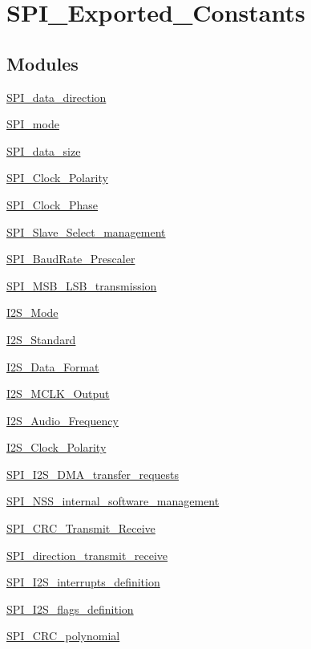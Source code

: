 \hypertarget{group__SPI__Exported__Constants}{
\section{SPI\_\-Exported\_\-Constants}
\label{group__SPI__Exported__Constants}
}
\subsection*{Modules}
\begin{DoxyCompactItemize}
\item 
\hyperlink{group__SPI__data__direction}{SPI\_\-data\_\-direction}
\item 
\hyperlink{group__SPI__mode}{SPI\_\-mode}
\item 
\hyperlink{group__SPI__data__size}{SPI\_\-data\_\-size}
\item 
\hyperlink{group__SPI__Clock__Polarity}{SPI\_\-Clock\_\-Polarity}
\item 
\hyperlink{group__SPI__Clock__Phase}{SPI\_\-Clock\_\-Phase}
\item 
\hyperlink{group__SPI__Slave__Select__management}{SPI\_\-Slave\_\-Select\_\-management}
\item 
\hyperlink{group__SPI__BaudRate__Prescaler}{SPI\_\-BaudRate\_\-Prescaler}
\item 
\hyperlink{group__SPI__MSB__LSB__transmission}{SPI\_\-MSB\_\-LSB\_\-transmission}
\item 
\hyperlink{group__I2S__Mode}{I2S\_\-Mode}
\item 
\hyperlink{group__I2S__Standard}{I2S\_\-Standard}
\item 
\hyperlink{group__I2S__Data__Format}{I2S\_\-Data\_\-Format}
\item 
\hyperlink{group__I2S__MCLK__Output}{I2S\_\-MCLK\_\-Output}
\item 
\hyperlink{group__I2S__Audio__Frequency}{I2S\_\-Audio\_\-Frequency}
\item 
\hyperlink{group__I2S__Clock__Polarity}{I2S\_\-Clock\_\-Polarity}
\item 
\hyperlink{group__SPI__I2S__DMA__transfer__requests}{SPI\_\-I2S\_\-DMA\_\-transfer\_\-requests}
\item 
\hyperlink{group__SPI__NSS__internal__software__management}{SPI\_\-NSS\_\-internal\_\-software\_\-management}
\item 
\hyperlink{group__SPI__CRC__Transmit__Receive}{SPI\_\-CRC\_\-Transmit\_\-Receive}
\item 
\hyperlink{group__SPI__direction__transmit__receive}{SPI\_\-direction\_\-transmit\_\-receive}
\item 
\hyperlink{group__SPI__I2S__interrupts__definition}{SPI\_\-I2S\_\-interrupts\_\-definition}
\item 
\hyperlink{group__SPI__I2S__flags__definition}{SPI\_\-I2S\_\-flags\_\-definition}
\item 
\hyperlink{group__SPI__CRC__polynomial}{SPI\_\-CRC\_\-polynomial}
\end{DoxyCompactItemize}
